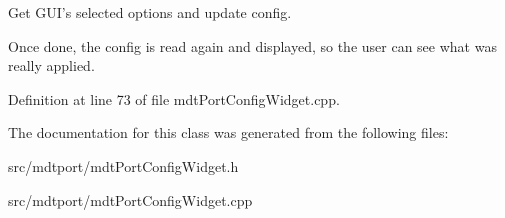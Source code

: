 Get GUI's selected options and update config. 

Once done, the config is read again and displayed, so the user can see what was really applied. 

Definition at line 73 of file mdtPortConfigWidget.cpp.



The documentation for this class was generated from the following files:\begin{DoxyCompactItemize}
\item 
src/mdtport/mdtPortConfigWidget.h\item 
src/mdtport/mdtPortConfigWidget.cpp\end{DoxyCompactItemize}
